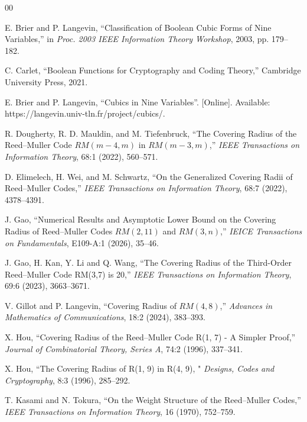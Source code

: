 \documentclass[11pt]{article}
\newtheorem{open problem}{Open problem}
\begin{document}
\begin{thebibliography}{00}



E. Brier and P. Langevin, ``Classification of Boolean Cubic Forms of Nine Variables,'' in \emph{Proc. 2003 IEEE Information Theory Workshop}, 2003, pp. 179--182.

 C. Carlet, ``Boolean Functions for Cryptography and Coding Theory,'' Cambridge University Press, 2021.

E. Brier and P. Langevin, ``Cubics in Nine Variables''. [Online]. Available: https://langevin.univ-tln.fr/project/cubics/.

 R. Dougherty, R. D. Mauldin, and M. Tiefenbruck, ``The Covering Radius of the Reed--Muller Code \(RM(m-4,m)\) in \(RM(m-3,m)\),'' \emph{IEEE Transactions on Information Theory}, 68:1 (2022), 560--571.

 D. Elimelech, H. Wei, and M. Schwartz, ``On the Generalized Covering Radii of Reed--Muller Codes,'' \emph{IEEE Transactions on Information Theory}, 68:7 (2022), 4378--4391.

 J. Gao, ``Numerical Results and Asymptotic Lower Bound on the Covering Radius of Reed--Muller Codes \(RM(2,11)\) and \(RM(3,n)\),'' \emph{IEICE Transactions on Fundamentals}, E109-A:1 (2026), 35--46.

 J. Gao, H. Kan, Y. Li and Q. Wang,  ``The Covering Radius of the Third-Order
Reed--Muller Code RM(3,7) is 20,'' \emph{IEEE Transactions on Information Theory}, 69:6 (2023), 3663--3671.

 V. Gillot and P. Langevin, ``Covering Radius of \(RM(4,8)\),'' \emph{Advances in Mathematics of Communications}, 18:2 (2024), 383--393.

 X. Hou,  ``Covering Radius of the Reed--Muller Code R(1, 7) - A Simpler Proof,'' \emph{Journal of Combinatorial Theory, Series A}, 74:2 (1996), 337--341.

 X. Hou,  ``The Covering Radius of R(1, 9) in R(4, 9), " \emph{Designs, Codes and Cryptography}, 8:3 (1996), 285--292.

 T. Kasami and N. Tokura, ``On the Weight Structure of the Reed--Muller
Codes,'' \emph{IEEE Transactions on Information Theory}, 16 (1970), 752--759.


\end{thebibliography}
\end{document}
